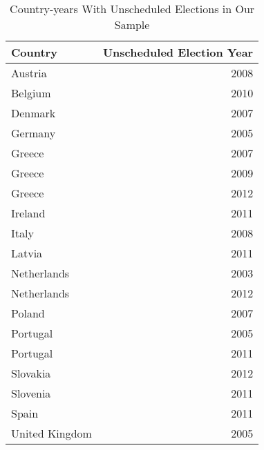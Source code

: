 \begin{table}[ht]
\centering
\caption{Country-years With Unscheduled Elections in Our Sample} 
\label{unschedule_list}
\begin{tabular}{lr}
  \hline
Country & Unscheduled Election Year \\ 
  \hline
Austria & 2008 \\ 
  Belgium & 2010 \\ 
  Denmark & 2007 \\ 
  Germany & 2005 \\ 
  Greece & 2007 \\ 
  Greece & 2009 \\ 
  Greece & 2012 \\ 
  Ireland & 2011 \\ 
  Italy & 2008 \\ 
  Latvia & 2011 \\ 
  Netherlands & 2003 \\ 
  Netherlands & 2012 \\ 
  Poland & 2007 \\ 
  Portugal & 2005 \\ 
  Portugal & 2011 \\ 
  Slovakia & 2012 \\ 
  Slovenia & 2011 \\ 
  Spain & 2011 \\ 
  United Kingdom & 2005 \\ 
   \hline
\end{tabular}
\end{table}
